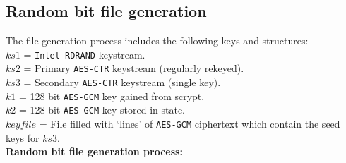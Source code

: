 \documentclass{paper}
\begin{document}
			\subsection{Random bit file generation}
				The file generation process includes the following keys and structures:\\
				$\mathit{ks1}$ = \texttt{Intel RDRAND} keystream.\\
				$\mathit{ks2}$ = Primary \texttt{AES-CTR} keystream (regularly rekeyed).\\
				$\mathit{ks3}$ = Secondary \texttt{AES-CTR} keystream (single key).\\
				$\mathit{k1}$ = 128 bit \texttt{AES-GCM} key gained from scrypt.\\
				$\mathit{k2}$ = 128 bit \texttt{AES-GCM} key stored in state.\\
				$\mathit{keyfile}$ = File filled with `lines' of \texttt{AES-GCM} ciphertext which contain the seed keys for $\mathit{ks3}$.\vspace{1em}\\
				\textbf{Random bit file generation process:}
				\vspace{-0.75em}
\end{document}
